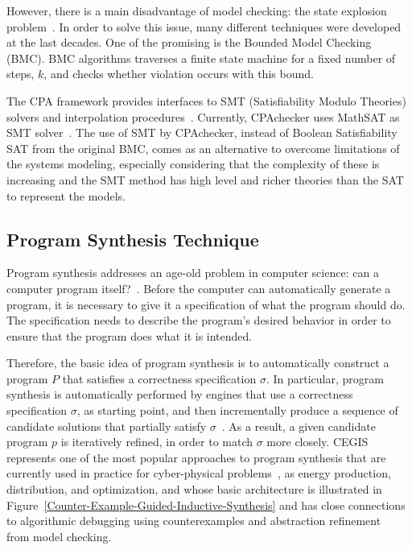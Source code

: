 \documentclass[journal]{IEEEtran}
\begin{document}
However, there is a main disadvantage of model checking: the state explosion problem~\cite{Clarke2012}. In order to solve this issue, many different techniques were developed at the last decades. One of the promising is the Bounded Model Checking (BMC). BMC algorithms traverses a finite state machine for a fixed number of steps, $k$, and checks whether violation occurs with this bound. 

The CPA framework provides interfaces to SMT (Satisfiability Modulo Theories) solvers and interpolation procedures~\cite{Beyer2011}. Currently, CPAchecker uses MathSAT as SMT solver~\cite{Beyer2011}. The use of SMT by CPAchecker, instead of Boolean Satisfiability SAT from the original BMC, comes as an alternative to overcome limitations of the systems modeling, especially considering that the complexity of these is increasing and the SMT method has high level and richer theories than the SAT to represent the models.

%
%
%
%
\subsection{Program Synthesis Technique}
\label{sec:ProgramSynthesis}

Program synthesis addresses an age-old problem in computer science: can a computer program itself?~\cite{Bornholt2019}. Before the computer can automatically generate a program, it is necessary to give it a specification of what the program should do. The specification needs to describe the program’s desired behavior in order to ensure that the program does what it is intended.

Therefore, the basic idea of program synthesis is to automatically construct a program $P$ that satisfies a correctness specification $\sigma$. In particular, program synthesis is automatically performed by engines that use a correctness specification $\sigma$, as starting point, and then incrementally produce a sequence of candidate solutions that partially satisfy $\sigma$~\cite{Abateetal2017}. As a result, a given candidate program $p$ is iteratively refined, in order to match $\sigma$ more closely. CEGIS represents one of the most popular approaches to program synthesis that are currently used in practice for cyber-physical problems~\cite{Abateetal2017}, as energy production, distribution, and optimization, and  whose basic architecture is illustrated in Figure~\ref{Counter-Example-Guided-Inductive-Synthesis} and has close connections to algorithmic debugging using counterexamples and abstraction refinement~\cite{Alur} from model checking. 
\end{document}

